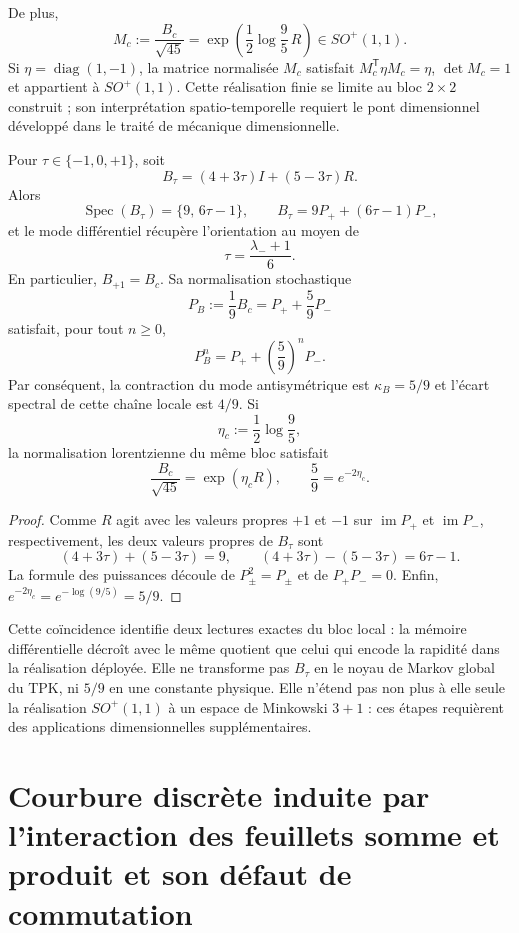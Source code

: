 De plus,
\[
M_c:=\frac{B_c}{\sqrt{45}}
=\exp\left(\frac12\log\frac95\,R\right)
\in SO^+(1,1).
\]
Si \(\eta=\operatorname{diag}(1,-1)\), la matrice normalisée \(M_c\) satisfait
\(M_c^{\mathsf T}\eta M_c=\eta\), \(\det M_c=1\) et appartient à
\(SO^+(1,1)\). Cette réalisation finie se limite au bloc \(2\times2\)
construit ; son interprétation spatio-temporelle requiert le pont dimensionnel
développé dans le traité de mécanique dimensionnelle.

\begin{proposition}
\label{prop:app-trit-espectral-markov-lorentz-rev8}
Pour \(\tau\in\{-1,0,+1\}\), soit
\[
 B_\tau=(4+3\tau)I+(5-3\tau)R.
\]
Alors
\[
 \operatorname{Spec}(B_\tau)=\{9,\,6\tau-1\},
 \qquad
 B_\tau=9P_++(6\tau-1)P_-,
\]
et le mode différentiel récupère l'orientation au moyen de
\[
 \tau=\frac{\lambda_-+1}{6}.
\]
En particulier, \(B_{+1}=B_c\). Sa normalisation stochastique
\[
 P_B:=\frac{1}{9}B_c=P_++\frac59P_-
\]
satisfait, pour tout \(n\geq0\),
\[
 P_B^n=P_++\left(\frac59\right)^n P_-.
\]
Par conséquent, la contraction du mode antisymétrique est
\(\kappa_B=5/9\) et l'écart spectral de cette chaîne locale est \(4/9\).
Si
\[
 \eta_c:=\frac12\log\frac95,
\]
la normalisation lorentzienne du même bloc satisfait
\[
 \frac{B_c}{\sqrt{45}}=\exp(\eta_c R),
 \qquad
 \boxed{\frac59=e^{-2\eta_c}}.
\]
\end{proposition}

\begin{proof}
Comme \(R\) agit avec les valeurs propres \(+1\) et \(-1\) sur
\(\operatorname{im}P_+\) et \(\operatorname{im}P_-\), respectivement, les
deux valeurs propres de \(B_\tau\) sont
\[
 (4+3\tau)+(5-3\tau)=9,\qquad
 (4+3\tau)-(5-3\tau)=6\tau-1.
\]
La formule des puissances découle de
\(P_\pm^2=P_\pm\) et de \(P_+P_-=0\). Enfin,
\(e^{-2\eta_c}=e^{-\log(9/5)}=5/9\).
\end{proof}

Cette coïncidence identifie deux lectures exactes du bloc local : la
mémoire différentielle décroît avec le même quotient que celui qui encode la rapidité
dans la réalisation déployée. Elle ne transforme pas \(B_\tau\) en le noyau de
Markov global du TPK, ni \(5/9\) en une constante physique. Elle n'étend pas non plus
à elle seule la réalisation \(SO^+(1,1)\) à un espace de Minkowski
\(3+1\) : ces étapes requièrent des applications dimensionnelles supplémentaires.

\section{Courbure discrète induite par l'interaction des feuillets somme et produit et son défaut de commutation}

